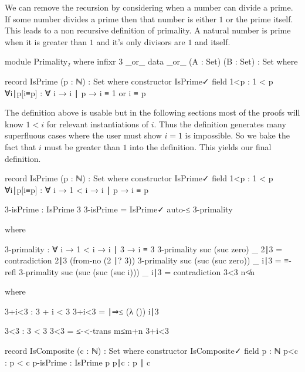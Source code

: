 \documentclass[./Thesis.tex]{subfiles}
\begin{document}
We can remove the recursion by considering when a number can divide a prime. If
some number divides a prime then that number is either $1$ or the prime itself.
This leads to a non recursive definition of primality. A natural number is prime
when it is greater than $1$ and it's only divisors are $1$ and itself.
\begin{code}[hide]
  module Primality₂ where
    infixr 3 _or_
    data _or_ (A : Set) (B : Set) : Set where
\end{code}
\begin{code}
    record IsPrime (p : ℕ) : Set where
      constructor IsPrime✓
      field
        1<p : 1 < p
        ∀i∣p[i≡p] : ∀ {i} → i ∣ p → i ≡ 1 or i ≡ p
\end{code}
The definition above is usable but in the following sections most of the proofs
will know $1 < i$ for relevant instantiations of $i$. Thus the definition
generates many superfluous cases where the user must show $i = 1$ is impossible.
So we bake the fact that $i$ must be greater than $1$ into the definition. This
yields our final definition.
\begin{code}
  record IsPrime (p : ℕ) : Set where
    constructor IsPrime✓
    field
      1<p : 1 < p
      ∀i∣p[i≡p] : ∀ {i} → 1 < i → i ∣ p → i ≡ p
\end{code}
\begin{code}
  3-isPrime : IsPrime 3
  3-isPrime = IsPrime✓ auto-≤ 3-primality
\end{code}
\begin{code}[hide]
    where
\end{code}
\begin{code}
    3-primality : ∀ {i} → 1 < i → i ∣ 3 → i ≡ 3
    3-primality {suc (suc zero)} _ 2∣3 = contradiction 2∣3 (from-no (2 ∣? 3))
    3-primality {suc (suc (suc zero))} _ i∣3 = ≡-refl
    3-primality {suc (suc (suc (suc i)))} _ i∣3 = contradiction 3<3 n≮n
\end{code}
\begin{code}[hide]
      where
\end{code}
\begin{code}
      3+i<3 : 3 + i < 3
      3+i<3 = ∣⇒≤ (λ ()) i∣3
\end{code}
\begin{code}
      3<3 : 3 < 3
      3<3 = ≤-<-trans m≤m+n 3+i<3
\end{code}
\begin{code}
  record IsComposite (c : ℕ) : Set where
    constructor IsComposite✓
    field
      p : ℕ
      p<c : p < c
      p-isPrime : IsPrime p
      p∣c : p ∣ c
\end{code}
\end{document}
